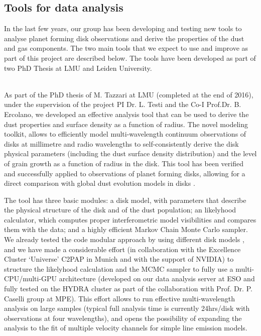 \documentclass[10pt,fleqn,twoside]{article}
\begin{document}
\subsection{Tools for data analysis}
\label{s_tools}

In the last few years, our group has been developing and testing new tools to analyse planet forming disk observations and derive the properties of the dust and gas components. The two main tools that we expect to use and improve as part of this project are described below. The tools have been developed as part of two PhD Thesis at LMU and Leiden University.

\vspace{1em}{\Tcol\bf Dust properties and surface density as a function of radius}\\
As part of the PhD thesis of M. Tazzari at LMU (completed at the end of 2016), under the supervision of the project PI Dr. L. Testi and the Co-I Prof.Dr. B. Ercolano, we developed an effective analysis tool that can be used to derive the dust properties and surface density as a function of radius. The novel modeling toolkit, allows to efficiently model multi-wavelength continuum observations of disks at millimetre and radio wavelengths to self-consistently derive the disk physical parameters (including the dust surface density distribution) and the level of grain growth as a function of radius in the disk. This tool has been verified and successfully applied to observations of planet forming disks, allowing for a direct comparison with global dust evolution models in disks \citep[][Tazzari et al. in prep.]{2016A&A...588A..53T}.  

The tool has three basic modules: a disk model, with parameters that describe the physical structure of the disk and of the dust population; an likelyhood calculator, which computes proper interferometric model visibilities and compares them with the data; and a highly efficient Markov Chain Monte Carlo sampler.
We already tested the code modular approach by using different disk models \citep[e.g.\ ][]{2016A&A...588A.112G,2016A&A...588A..53T,TazzariPhD}, and we have made a considerable effort (in collaboration with the Excellence Cluster `Universe' C2PAP in Munich and with the support of NVIDIA) to structure the likelyhood calculation and the MCMC sampler to fully use a multi-CPU/multi-GPU architecture (developed on our data analysis server at ESO and fully tested on the HYDRA cluster as part of the collaboration with Prof. Dr. P. Caselli group at MPE). This effort allows to run effective multi-wavelength analysis on large samples (typical full analysis time is currently 24hrs/disk with observations at four wavelengths), and opens the possibility of expanding the analysis to the fit of multiple velocity channels for simple line emission models. 
\end{document}
